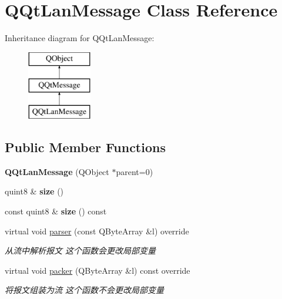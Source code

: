 \hypertarget{class_q_qt_lan_message}{}\section{Q\+Qt\+Lan\+Message Class Reference}
\label{class_q_qt_lan_message}
Inheritance diagram for Q\+Qt\+Lan\+Message\+:\begin{figure}[H]
\begin{center}
\leavevmode
\includegraphics[height=3.000000cm]{class_q_qt_lan_message}
\end{center}
\end{figure}
\subsection*{Public Member Functions}
\begin{DoxyCompactItemize}
\item 
\mbox{\label{class_q_qt_lan_message_a7ec4d86c0d9f7c6b399bf4125c1946d3}} 
{\bfseries Q\+Qt\+Lan\+Message} (Q\+Object $\ast$parent=0)
\item 
\mbox{\label{class_q_qt_lan_message_a31be2633275d38bcc74264cb318a3c52}} 
quint8 \& {\bfseries size} ()
\item 
\mbox{\label{class_q_qt_lan_message_aca8966f2006fa5f8e71f47cefc3e1538}} 
const quint8 \& {\bfseries size} () const
\item 
virtual void \mbox{\hyperlink{class_q_qt_lan_message_a778629e75eb24a48b54988b25bd32250}{parser}} (const Q\+Byte\+Array \&l) override
\begin{DoxyCompactList}\small\item\em 从流中解析报文 这个函数会更改局部变量 \end{DoxyCompactList}\item 
virtual void \mbox{\hyperlink{class_q_qt_lan_message_ad06aa6cee4485251e1c9ae53e35a2cdc}{packer}} (Q\+Byte\+Array \&l) const override
\begin{DoxyCompactList}\small\item\em 将报文组装为流 这个函数不会更改局部变量 \end{DoxyCompactList}\end{DoxyCompactItemize}


